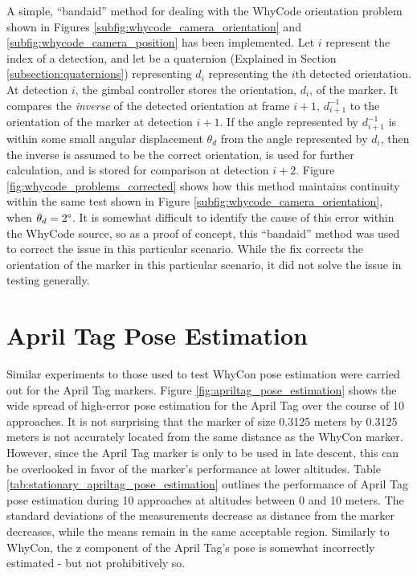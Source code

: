 A simple, ``bandaid'' method for dealing with the WhyCode orientation problem shown in Figures \ref{subfig:whycode_camera_orientation} and \ref{subfig:whycode_camera_position} has been implemented. Let $i$ represent the index of a detection, and let be a quaternion (Explained in Section \ref{subsection:quaternions}) representing $d_i$ representing the $i\mathrm{th}$ detected orientation. At detection $i$, the gimbal controller stores the orientation, $d_i$, of the marker. It compares the \textit{inverse} of the detected orientation at frame $i+1$, $d_{i+1}^{-1}$ to the orientation of the marker at detection $i+1$. If the angle represented by $d_{i+1}^{-1}$ is within some small angular displacement $\theta_d$ from the angle represented by $d_i$, then the inverse is assumed to be the correct orientation, is used for further calculation, and is stored for comparison at detection $i+2$. Figure \ref{fig:whycode_problems_corrected} shows how this method maintains continuity within the same test shown in Figure \ref{subfig:whycode_camera_orientation}, when $\theta_d=2\degree$. It is somewhat difficult to identify the cause of this error within the WhyCode source, so as a proof of concept, this ``bandaid'' method was used to correct the issue in this particular scenario. While the fix corrects the orientation of the marker in this particular scenario, it did not solve the issue in testing generally.

\section{April Tag Pose Estimation}

Similar experiments to those used to test WhyCon pose estimation were carried out for the April Tag markers. Figure \ref{fig:apriltag_pose_estimation} shows the wide spread of high-error pose estimation for the April Tag over the course of 10 approaches. It is not surprising that the marker of size 0.3125 meters by 0.3125 meters is not accurately located from the same distance as the WhyCon marker. However, since the April Tag marker is only to be used in late descent, this can be overlooked in favor of the marker's performance at lower altitudes. Table \ref{tab:stationary_apriltag_pose_estimation} outlines the performance of April Tag pose estimation during 10 approaches at altitudes between 0 and 10 meters. The standard deviations of the measurements decrease as distance from the marker decreases, while the means remain in the same acceptable region. Similarly to WhyCon, the z component of the April Tag's pose is somewhat incorrectly estimated - but not prohibitively so. 


